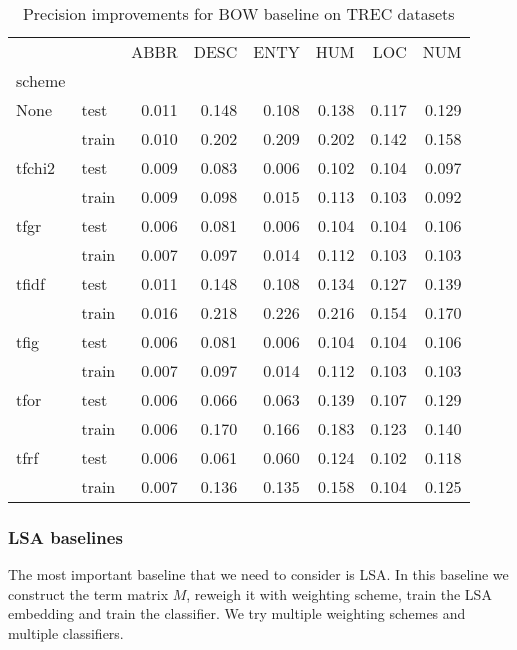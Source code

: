 \begin{table}[H]
\begin{center}

\begin{tabular}{llrrrrrr}
\toprule
{} &&  ABBR &  DESC &  ENTY &  HUM &  LOC &  NUM \\
scheme &  & & & &&&\\
\midrule
None & test & 0.011 & 0.148 & 0.108 &0.138 &0.117 &0.129 \\
{} & train & 0.010 & 0.202 & 0.209 &0.202 &0.142 &0.158 \\
tfchi2 & test & 0.009 & 0.083 & 0.006 &0.102 &0.104 &0.097 \\
{} & train & 0.009 & 0.098 & 0.015 &0.113 &0.103 &0.092 \\
tfgr & test & 0.006 & 0.081 & 0.006 &0.104 &0.104 &0.106 \\
{} & train & 0.007 & 0.097 & 0.014 &0.112 &0.103 &0.103 \\
tfidf & test & 0.011 & 0.148 & 0.108 &0.134 &0.127 &0.139 \\
{} & train & 0.016 & 0.218 & 0.226 &0.216 &0.154 &0.170 \\
tfig & test & 0.006 & 0.081 & 0.006 &0.104 &0.104 &0.106 \\
{} & train & 0.007 & 0.097 & 0.014 &0.112 &0.103 &0.103 \\
tfor & test & 0.006 & 0.066 & 0.063 &0.139 &0.107 &0.129 \\
{} & train & 0.006 & 0.170 & 0.166 &0.183 &0.123 &0.140 \\
tfrf & test & 0.006 & 0.061 & 0.060 &0.124 &0.102 &0.118 \\
{} & train & 0.007 & 0.136 & 0.135 &0.158 &0.104 &0.125 \\
\bottomrule
\end{tabular}

\caption[Precision improvements for BOW baseline on TREC datasets]{Precision improvements for BOW baseline on TREC datasets}
\label{tab:}
\end{center}
\end{table}

    \* %


    \subsubsection{LSA baselines}
    The most important baseline that we need to consider is LSA.
    In this baseline we construct the term matrix $M$, reweigh it with weighting scheme, train the LSA embedding and train the classifier.
    We try multiple weighting schemes and multiple classifiers.
    
